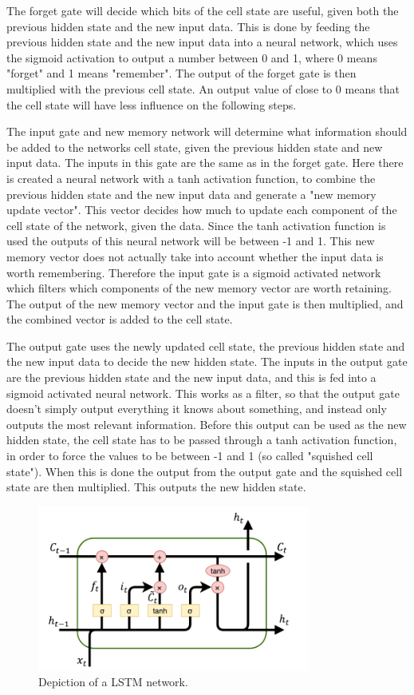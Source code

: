 The forget gate will decide which bits of the cell state are useful, given both the previous hidden state and the new input data. 
This is done by feeding the previous hidden state and the new input data into a neural network, which uses the sigmoid activation to output a number between 0 and 1, where 0 means "forget" and 1 means "remember". 
The output of the forget gate is then multiplied with the previous cell state. An output value of close to 0 means that the cell state will have less influence on the following steps. 

The input gate and new memory network will determine what information should be added to the networks cell state, given the previous hidden state and new input data. The inputs in this gate are the same as in the forget gate. 
Here there is created a neural network with a tanh activation function, to combine the previous hidden state and the new input data and generate a "new memory update vector". This vector decides how much to update each component of the cell state of the network, given the data. 
Since the tanh activation function is used the outputs of this neural network will be between -1 and 1. 
This new memory vector does not actually take into account whether the input data is worth remembering. 
Therefore the input gate is a sigmoid activated network which filters which components of the new memory vector are worth retaining. 
The output of the new memory vector and the input gate is then multiplied, and the combined vector is added to the cell state. 

The output gate uses the newly updated cell state, the previous hidden state and the new input data to decide the new hidden state. 
The inputs in the output gate are the previous hidden state and the new input data, and this is fed into a sigmoid activated neural network. 
This works as a filter, so that the output gate doesn't simply output everything it knows about something, and instead only outputs the most relevant information. 
Before this output can be used as the new hidden state, the cell state has to be passed through a tanh activation function, in order to force the values to be between -1 and 1 (so called "squished cell state"). 
When this is done the output from the output gate and the squished cell state are then multiplied. This outputs the new hidden state.  

\begin{figure}[H]
    \centering
    \includegraphics[width=0.8\textwidth]{data/Figures/Neural networks/lstm.png}
    \caption[Long Short-Term Memory network]{Depiction of a LSTM network.}\label{fig:LSTM}
\end{figure}

